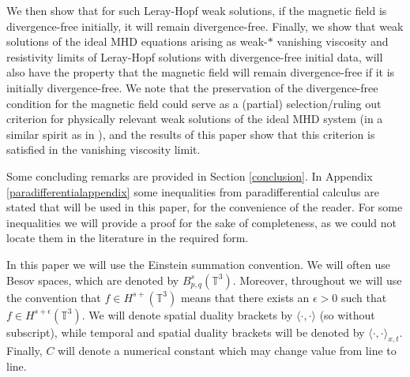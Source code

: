 \documentclass[12pt,a4paper]{article}
\theoremstyle{definition}
\theoremstyle{remark}
\numberwithin{equation}{section}
\begin{document}
We then show that for such Leray-Hopf weak solutions, if the magnetic field is divergence-free initially, it will remain divergence-free. Finally, we show that weak solutions of the ideal MHD equations arising as weak-$*$ vanishing viscosity and resistivity limits of Leray-Hopf solutions with divergence-free initial data, will also have the property that the magnetic field will remain divergence-free if it is initially divergence-free. We note that the preservation of the divergence-free condition for the magnetic field could serve as a (partial) selection/ruling out criterion for physically relevant weak solutions of the ideal MHD system (in a similar spirit as in \cite{bardos2012,bardos2013,szekelyhidi2011}), and the results of this paper show that this criterion is satisfied in the vanishing viscosity limit.

Some concluding remarks are provided in Section \ref{conclusion}. In Appendix \ref{paradifferentialappendix} some inequalities from paradifferential calculus are stated that will be used in this paper, for the convenience of the reader. For some inequalities we will provide a proof for the sake of completeness, as we could not locate them in the literature in the required form.

In this paper we will use the Einstein summation convention. We will often use Besov spaces, which are denoted by $B^s_{p,q} (\mathbb{T}^3)$. Moreover, throughout we will use the convention that $f \in H^{s+} (\mathbb{T}^3)$ means that there exists an $\epsilon > 0$ such that $f \in H^{s + \epsilon} (\mathbb{T}^3)$. We will denote spatial duality brackets by $\langle \cdot, \cdot \rangle$ (so without subscript), while temporal and spatial duality brackets will be denoted by $\langle \cdot , \cdot \rangle_{x,t}$. Finally, $C$ will denote a numerical constant which may change value from line to line. 
\end{document}
